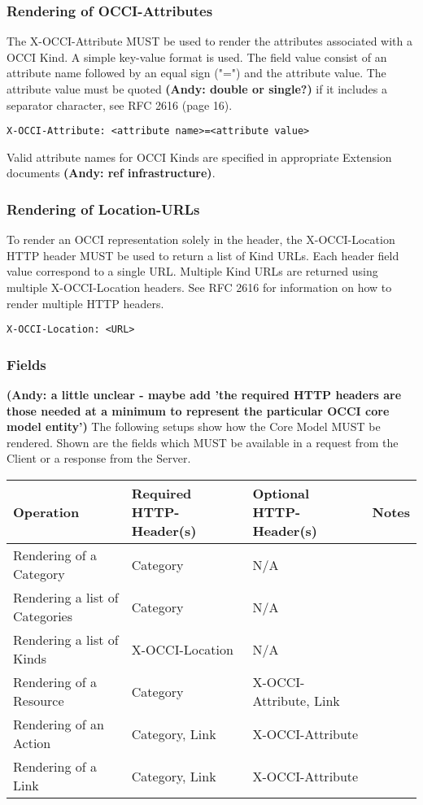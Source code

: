 \documentclass[10pt,a4paper]{article}
\begin{document}
\subsubsection{Rendering of OCCI-Attributes}
The X-OCCI-Attribute MUST be used to render the attributes associated
with a OCCI Kind. A simple key-value format is used. The field value
consist of an attribute name followed by an equal sign ("=") and the
attribute value. The attribute value must be quoted \textbf{(Andy: double or single?)} if it includes a
separator character, see RFC 2616 (page 16).

\begin{verbatim}
X-OCCI-Attribute: <attribute name>=<attribute value>
\end{verbatim}

Valid attribute names for OCCI Kinds are specified in appropriate
Extension documents \textbf{(Andy: ref infrastructure)}.

\subsubsection{Rendering of Location-URLs}
To render an OCCI representation solely in the header, the
X-OCCI-Location HTTP header MUST be used to return a list of Kind
URLs. Each header field value correspond to a single URL. Multiple
Kind URLs are returned using multiple X-OCCI-Location headers. See RFC
2616 for information on how to render multiple HTTP headers.

\begin{verbatim}
X-OCCI-Location: <URL>
\end{verbatim}

\subsubsection{Fields}
\textbf{(Andy: a little unclear - maybe add 'the required HTTP headers are
 those needed at a minimum to represent the particular OCCI core model entity')}
The following setups show how the Core Model MUST be rendered. Shown
are the fields which MUST be available in a request from the Client or
a response from the Server.

\begin{tabular}{l|l|l|l}
Operation & Required HTTP-Header(s) & Optional HTTP-Header(s) & Notes \\
\hline
Rendering of a Category & Category & N/A & \\
Rendering a list of Categories & Category & N/A & \\
Rendering a list of Kinds & X-OCCI-Location & N/A & \\
Rendering of a Resource & Category & X-OCCI-Attribute, Link & \\
Rendering of an Action & Category, Link & X-OCCI-Attribute & \\
Rendering of a Link & Category, Link & X-OCCI-Attribute & \\
\end{tabular}
\end{document}

